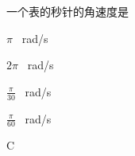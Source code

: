 一个表的秒针的角速度是\paren[]
\begin{choices}
	\item \(\pi\) \qty{}{rad/s}
	\item \(2\pi\) \qty{}{rad/s}
	\item \(\frac{\pi}{30}\) \qty{}{rad/s}
	\item \(\frac{\pi}{60}\) \qty{}{rad/s}
\end{choices}	
\begin{answer}
	C
\end{answer}